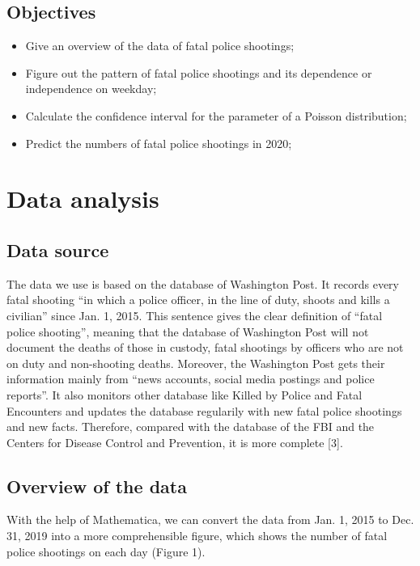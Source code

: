 \documentclass[a4paper]{article}
\begin{document}
	\subsection{Objectives}
	\begin{itemize}
	\item Give an overview of the data of fatal police shootings;
	\item Figure out the pattern of fatal police shootings and its dependence or independence on weekday;
	\item Calculate the confidence interval for the parameter of a Poisson distribution;
	\item Predict the numbers of fatal police shootings in 2020;
	\end{itemize}

\section{Data analysis}
	\subsection{Data source}
	The data we use is based on the database of Washington Post. It records every fatal shooting “in which a police officer, in the line of duty, shoots and kills a civilian” since Jan. 1, 2015. This sentence gives the clear definition of “fatal police shooting”, meaning that the database of Washington Post will not document the deaths of those in custody, fatal shootings by officers who are not on duty and non-shooting deaths. Moreover, the Washington Post gets their information mainly from “news accounts, social media postings and police reports”. It also monitors other database like Killed by Police and Fatal Encounters and updates the database regularily with new fatal police shootings and new facts. Therefore, compared with the database of the FBI and the Centers for Disease Control and Prevention, it is more complete [3].

	\subsection{Overview of the data}
	With the help of Mathematica, we can convert the data from Jan. 1, 2015 to Dec. 31, 2019 into a more comprehensible figure, which shows the number of fatal police shootings on each day (Figure 1).
	
\end{document}
